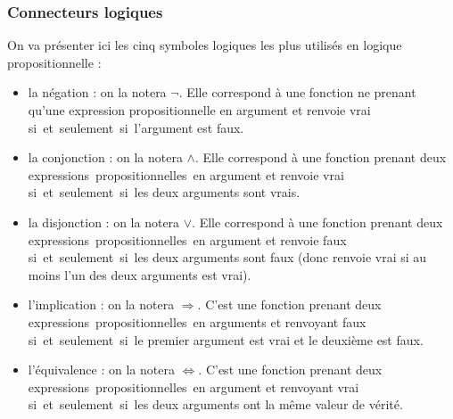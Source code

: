 \documentclass[a4paper, oneside]{report}
\newcommand{\expps}{expressions~propositionnelles~}
\newcommand{\ssi}{si~et~seulement~si~}
\begin{document}
\subsubsection*{Connecteurs logiques}
On va présenter ici les cinq symboles logiques les plus utilisés en logique propositionnelle :
\begin{itemize}
\item la négation : on la notera $\neg$. Elle correspond à une fonction ne prenant qu'une expression propositionnelle en argument et renvoie vrai \ssi l'argument est faux.

\item la conjonction : on la notera $\wedge$. Elle correspond à une fonction prenant deux \expps en argument et renvoie vrai \ssi les deux arguments sont vrais. 

\item la disjonction : on la notera $\vee$. Elle correspond à une fonction prenant deux \expps en argument et renvoie faux \ssi les deux arguments sont faux (donc renvoie vrai si au moins l'un des deux arguments est vrai).

\item l'implication : on la notera $\Rightarrow$. C'est une fonction prenant deux \expps en arguments et renvoyant faux \ssi le premier argument est vrai et le deuxième est faux.

\item l'équivalence : on la notera $\Leftrightarrow$. C'est une fonction prenant deux \expps en argument et renvoyant vrai \ssi les deux arguments ont la même valeur de vérité.

\end{itemize}

\newpage
\end{document}
